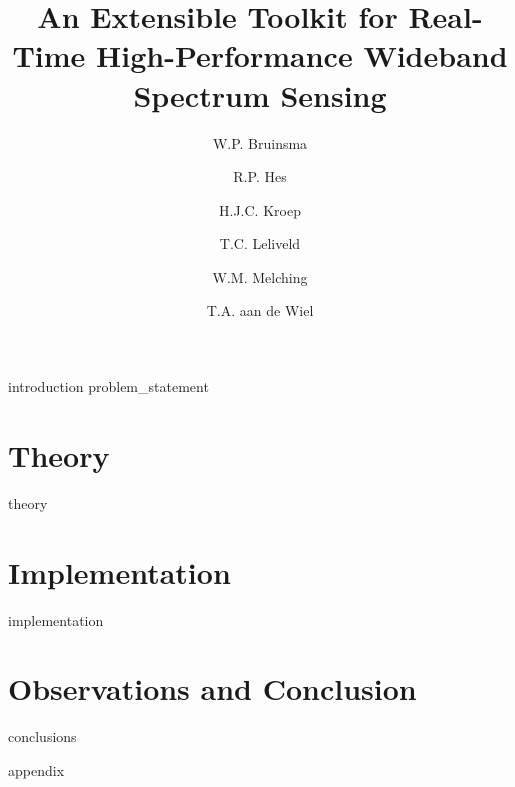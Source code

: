 \documentclass[a4paper, openany, oneside]{memoir}
\title{An Extensible Toolkit for Real-Time High-Performance Wideband Spectrum Sensing}
\author{W.P. Bruinsma \and R.P. Hes \and H.J.C. Kroep \and T.C. Leliveld \and W.M. Melching \and T.A. aan de Wiel}
\begin{document}
\frontmatter

\begin{titlingpage}
  \pagestyle{empty}
  \maketitle
\end{titlingpage}


\tableofcontents

\mainmatter
{introduction}
{problem_statement}

\part{Theory}
\label{prt:theory}
{theory}
\part{Implementation}
\label{prt:implementation}
{implementation}


\part{Observations and Conclusion}
{conclusions}

\clearpage

\printbibliography

\clearpage
{}
{appendix}
\end{document}
